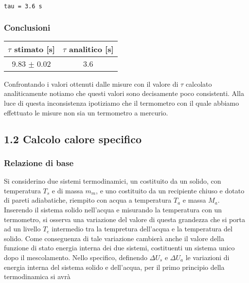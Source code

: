 \documentclass[11pt]{article}
\begin{document}
    \begin{Verbatim}[commandchars=\\\{\}]
tau = 3.6 s
    \end{Verbatim}

    \hypertarget{conclusioni}{%
\subsubsection{Conclusioni}\label{conclusioni}}

\begin{longtable}[]{@{}cc@{}}
\toprule
\(\tau\) stimato {[}s{]} & $\tau $ analitico {[}s{]}\tabularnewline
\midrule
\endhead
9.83 \(\pm\) 0.02 & 3.6\tabularnewline
\bottomrule
\end{longtable}

Confrontando i valori ottenuti dalle misure con il valore di \(\tau\)
calcolato analiticamente notiamo che questi valori sono decisamente poco
consistenti. Alla luce di questa inconsistenza ipotiziamo che il
termometro con il quale abbiamo effettuato le misure non sia un
termometro a mercurio.

    \hypertarget{calcolo-calore-specifico}{%
\subsection{1.2 Calcolo calore
specifico}\label{calcolo-calore-specifico}}

    \hypertarget{relazione-di-base}{%
\subsubsection{Relazione di base}\label{relazione-di-base}}

Si considerino due sistemi termodinamici, un costituito da un solido,
con temperatura \(T_{s}\) e di massa \(m_{m}\), e uno costituito da un
recipiente chiuso e dotato di pareti adiabatiche, riempito con acqua a
temperatura \(T_{a}\) e massa \(M_{a}\). Inserendo il sistema solido
nell'acqua e misurando la temperatura con un termometro, si osserva una
variazione del valore di questa grandezza che si porta ad un livello
\(T_{e}\) intermedio tra la tempretura dell'acqua e la temperatura del
solido. Come conseguenza di tale variazione cambierà anche il valore
della funzione di stato energia interna dei due sistemi, costituenti un
sistema unico dopo il mescolamento. Nello specifico, definendo
\(\Delta U_{s}\) e \(\Delta U_{a}\) le variazioni di energia interna del
sistema solido e dell'acqua, per il primo principio della termodinamica
si avrà
\end{document}
